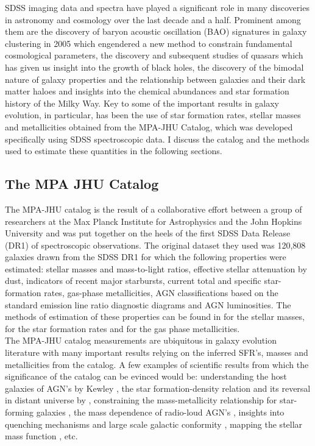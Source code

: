SDSS imaging data and spectra have played a significant role in many discoveries in astronomy and cosmology over the last decade and a half. Prominent among them are the discovery of baryon acoustic oscillation (BAO) signatures in galaxy clustering in 2005 which engendered a new method to constrain fundamental cosmological parameters, the discovery and subsequent studies of quasars which has given us insight into the growth of black holes, the discovery of the bimodal nature of galaxy properties and the relationship between galaxies and their dark matter haloes and insights into the chemical abundances and star formation history of the Milky Way. Key to some of the important results in galaxy evolution, in particular, has been the use of star formation rates, stellar masses and metallicities obtained from the MPA-JHU Catalog, which was developed specifically using SDSS spectroscopic data. I discuss the catalog and the methods used to estimate these quantities in the following sections.\\
 
\subsection{The MPA JHU Catalog}

The MPA-JHU catalog is the result of a collaborative effort between a group of researchers at the Max Planck Institute for Astrophysics and the John Hopkins University and was put together on the heels of the first SDSS Data Release (DR1) of spectroscopic observations. The original dataset they used was 120,808 galaxies drawn from the SDSS DR1 for which the following properties were estimated: stellar masses and mass-to-light ratios, effective stellar attenuation by dust, indicators of recent major starbursts, current total and specific star-formation rates, gas-phase metallicities, AGN classifications based on the standard emission line ratio diagnostic diagrams and AGN luminosities. The methods of estimation of these properties can be found in \citet{kauffmann_stellar_2003} for the stellar masses, \citet{brinchmann_physical_2004} for the star formation rates and \citet{tremonti_origin_2004} for the gas phase metallicities.\\

The MPA-JHU catalog measurements are ubiquitous in galaxy evolution literature with many important results relying on the inferred SFR's, masses and metallicities from the catalog. A few examples of scientific results from which the significance of the catalog can be evinced would be: understanding the host galaxies of AGN's by Kewley \citep{kewley2006}, the star formation-density relation and its reversal in distant universe by \citet{elbaz2007}, constraining the mass-metallicity relationship for star-forming galaxies \citep{kewley2008}, the mass dependence of radio-loud AGN's \citep{best2005}, insights into quenching mechanisms \citep{peng_mass_2010} and large scale galactic conformity \citep{kauffmann2013}, mapping the stellar mass function \citep{2009MNRAS.398.2177L, 2015MNRAS.454.4027D}, etc.\\

